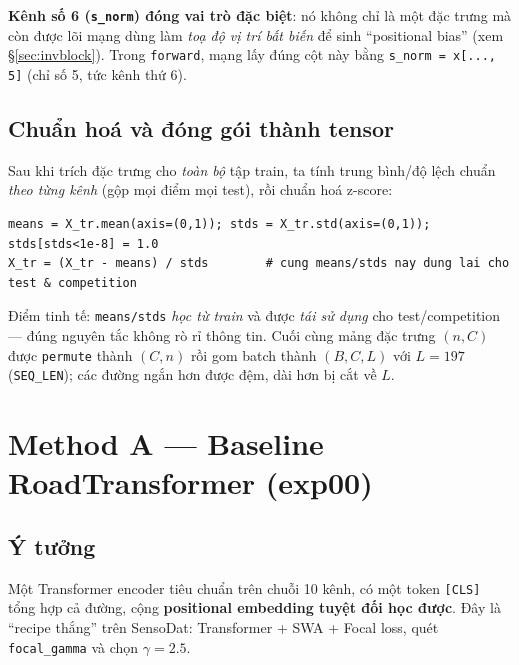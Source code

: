 \documentclass[11pt]{article}
\newcommand{\code}[1]{\textcolor{cInk}{\texttt{#1}}}
\theoremstyle{definition}
\begin{document}
\noindent\textbf{Kênh số 6 (\code{s\_norm}) đóng vai trò đặc biệt}: nó không chỉ
là một đặc trưng mà còn được lõi mạng dùng làm \emph{toạ độ vị trí bất biến} để
sinh ``positional bias'' (xem \S\ref{sec:invblock}). Trong \code{forward}, mạng
lấy đúng cột này bằng \code{s\_norm = x[..., 5]} (chỉ số 5, tức kênh thứ 6).

\subsection{Chuẩn hoá và đóng gói thành tensor}
Sau khi trích đặc trưng cho \emph{toàn bộ} tập train, ta tính trung bình/độ lệch
chuẩn \emph{theo từng kênh} (gộp mọi điểm mọi test), rồi chuẩn hoá z-score:
\begin{lstlisting}
means = X_tr.mean(axis=(0,1)); stds = X_tr.std(axis=(0,1)); stds[stds<1e-8] = 1.0
X_tr = (X_tr - means) / stds        # cung means/stds nay dung lai cho test & competition
\end{lstlisting}
Điểm tinh tế: \code{means/stds} \emph{học từ train} và được \emph{tái sử dụng}
cho test/competition --- đúng nguyên tắc không rò rỉ thông tin. Cuối cùng mảng
đặc trưng $(n,C)$ được \code{permute} thành $(C,n)$ rồi gom batch thành
$(B,C,L)$ với $L=197$ (\code{SEQ\_LEN}); các đường ngắn hơn được đệm, dài hơn bị
cắt về $L$.

\section{Method A --- Baseline \textcolor{cA}{RoadTransformer} (exp00)}
\label{sec:methodA}

\subsection{Ý tưởng}
Một Transformer encoder tiêu chuẩn trên chuỗi 10 kênh, có một token
\code{[CLS]} tổng hợp cả đường, cộng \textbf{positional embedding tuyệt đối
học được}. Đây là ``recipe thắng'' trên SensoDat: Transformer + SWA + Focal loss,
quét \code{focal\_gamma} và chọn $\gamma=2.5$.
\end{document}
